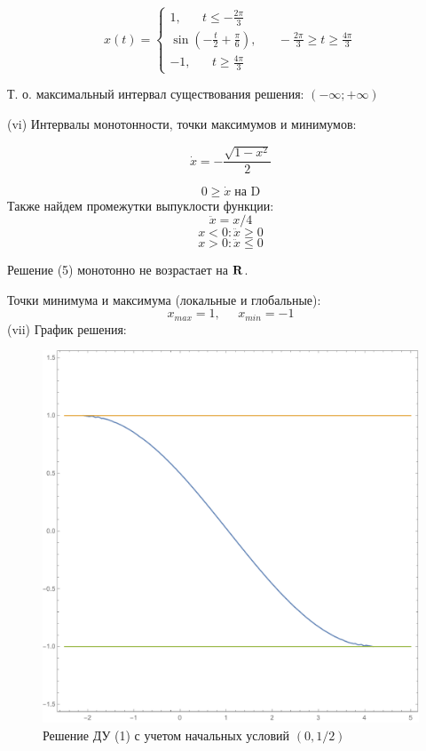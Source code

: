 \documentclass[a4paper, 12pt]{article}
\begin{document}
\begin{equation*}
x(t) = 
 \begin{cases}
    1, \;\;\;\;\;\; t\leq -\frac{2\pi}3\\
   \sin( -\frac t 2 + \frac {\pi}{6}), \;\;\;\;\;\;  -\frac{2\pi}3 \geq  t\geq \frac{4\pi}3\\
   -1, \;\;\;\;\;\; t\geq \frac{4\pi}3
 \end{cases}
\end{equation*}


Т. о. максимальный интервал существования решения: $(-\infty; +\infty)$

(vi) Интервалы монотонности, точки максимумов и минимумов:

\[\dot{x}=-\frac{\sqrt{1-x^2}}{2}\]

\[ 0 \geq \dot{x} \; \text{на D}\]
Также найдем промежутки выпуклости функции:
\[ \ddot{x} = x/4\]
\[ x < 0: \ddot{x} \geq 0 \]
\[x > 0: \ddot{x} \leq 0  \]

Решение (5) монотонно не возрастает на $\bf{R}$.


Точки минимума и максимума (локальные и глобальные):
\[x_{max} = 1, \;\;\;\;\; x_{min}= -1\]
(vii) График решения:




\begin{figure}[H]
	\centering
	\includegraphics[scale=0.6]{7}
	\caption{Решение ДУ (1) с учетом начальных условий $(0, 1/2)$}
\end{figure}
\end{document}
